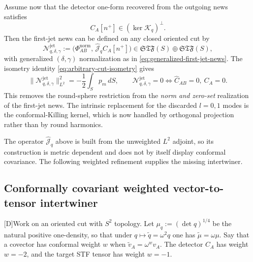 \documentclass[11pt,a4paper]{article}
\newcommand{\cN}{\mathcal{N}}
\newcommand{\statusD}{\textsf{[D]}}
\begin{document}
Assume now that the detector one-form recovered from the outgoing news satisfies
\begin{equation}\label{eq:CKV-orthogonality}
  C_A[n^+]\in(\ker\mathcal K_q)^\perp .
\end{equation}
Then the first-jet news can be defined on any closed oriented cut by
\begin{equation}\label{eq:arbitrary-cut-first-jet}
  \cN^{\mathrm{jet}}_{q,\delta,\gamma}
  :=
  \big(\Phi^{\mathrm{norm}}_{AB},\,\widehat{\mathcal J}_q C_A[n^+]\big)
  \in
  \mathfrak{STF}(S)\oplus\mathfrak{STF}(S),
\end{equation}
with generalized \((\delta,\gamma)\) normalization as in \eqref{eq:generalized-first-jet-news}.  The isometry identity \eqref{eq:arbitrary-cut-isometry} gives
\begin{equation}
  \|\cN^{\mathrm{jet}}_{q,\delta,\gamma}\|_{L^2}^2
  =
  -\frac12\int_S p_m\,dS ,
  \qquad
  \cN^{\mathrm{jet}}_{q,\delta,\gamma}=0
  \iff
  \hat C_{AB}=0,\ C_A=0 .
\end{equation}
This removes the round-sphere restriction from the \emph{norm and zero-set} realization of the first-jet news.  The intrinsic replacement for the discarded \(l=0,1\) modes is the conformal-Killing kernel, which is now handled by orthogonal projection rather than by round harmonics.

The operator \(\widehat{\mathcal J}_q\) above is built from the unweighted \(L^2\) adjoint, so its construction is metric dependent and does not by itself display conformal covariance.  The following weighted refinement supplies the missing intertwiner.

\subsection{Conformally covariant weighted vector-to-tensor intertwiner}

\statusD Work on an oriented cut with \(S^2\) topology.  Let
\(\mu_q:=(\det q)^{1/4}\) be the natural positive one-density, so that under
\(q\mapsto\tilde q=\omega^2q\) one has \(\tilde\mu=\omega\mu\).  Say that a covector has conformal weight \(w\) when \(\tilde v_A=\omega^w v_A\).  The detector \(C_A\) has weight \(w=-2\), and the target STF tensor has weight \(w=-1\).
\end{document}
